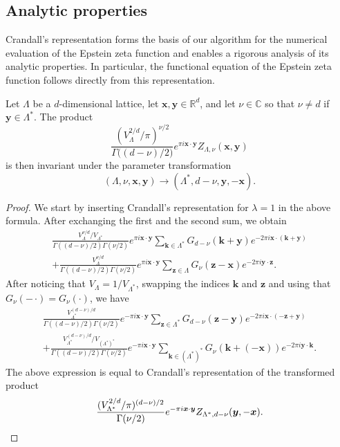 \documentclass[]{amsart}
\newcommand{\new}[1]{#1}
\newcommand{\zeps}[3]{\new{Z_{#1} (#2, #3)}}
\newcommand{\crandallreqs}{
Let \(\Lambda\) be a \(d\)-dimensional lattice,
let \(\bm x,\bm y\in\mathds{R}^d\), and let \(\nu\in\mathds C\)
so that \(\nu\neq d\) if \(\bm y\in\Lambda^{\ast}\). }
\numberwithin{mythm}{section}
\begin{document}
\subsection{Analytic properties}
\label{sec:props}

Crandall’s representation forms the basis of our algorithm for the numerical evaluation of the Epstein zeta function and enables a rigorous analysis of its analytic properties.  In particular, the functional equation of the Epstein zeta function follows directly from this representation.


\begin{corollary}
\label{funqeq}
\crandallreqs
The product
\[
\frac{(V_{\Lambda}^{2/d}/\pi)^{\nu/2}}{\Gamma\big((d-\nu)/2\big)}
e^{\pi i \bm x \cdot \bm y}\zeps{\Lambda, \nu}{\bm x}{\bm y}
\]
is then invariant under the parameter transformation
\[(\Lambda,\nu,\bm x,\bm y)\to 
(\Lambda^{\ast},d-\nu,\bm y,-\bm x).\]
\end{corollary}

\begin{proof}
We start by inserting Crandall's representation for $\lambda = 1$ in the above formula. After exchanging the first and the second sum, we obtain
\begin{align*}
\frac{V_{\Lambda}^{\nu/d}/V_{\Lambda^*}}{\Gamma((d-\nu)/2) \Gamma(\nu/2)} 
e^{\pi i \bm x \cdot \bm y}\sum_{\bm{k}\in\Lambda^{\ast}}G_{d-\nu}
(\bm{k}+\bm{y})e^{-2\pi i\bm{x}\cdot(\bm{k}+\bm{y})}
\\
+\frac{V_{\Lambda}^{\nu/d}}{\Gamma((d-\nu)/2) \Gamma(\nu/2)} 
e^{\pi i \bm x \cdot \bm y}\sum_{\bm{z}\in\Lambda}
G_{\nu}(\bm{z}-\bm{x})e^{-2\pi i\bm{y}\cdot\bm{z}}.
\end{align*}
After noticing that \(V_{\Lambda}=1/V_{\Lambda^{\ast}}\), swapping the indices \(\bm k\) and \(\bm z\)
and using that  \(G_\nu(-\,\bm \cdot)=G_\nu(\bm \cdot)\),
we have
\begin{align*}
\frac{V_{\Lambda^*}^{(d-\nu)/d}}{\Gamma((d-\nu)/2) \Gamma(\nu/2)} 
e^{-\pi i \bm x \cdot \bm y}\sum_{\bm{z}\in \Lambda^{\ast}}G_{d-\nu}
(\bm{z}-\bm{y})e^{-2\pi i\bm{x}\cdot (-\bm{z}+\bm y)}
\\
+\frac{V_{\Lambda^*}^{(d-\nu)/d}/V_{(\Lambda^*)^*}}{\Gamma((d-\nu)/2) \Gamma(\nu/2)} 
e^{-\pi i \bm x \cdot \bm y}\sum_{\bm{k}\in(\Lambda^{\ast})^{\ast}}
G_{\nu}(\bm{k}+(-\bm{x}))e^{-2\pi i\bm{y}\cdot\bm{k}}.
\end{align*}
The above expression is equal to Crandall's representation of the transformed product
\[
\frac{(V_{\Lambda^{\ast}}^{2/d}/\pi)^{(d-\nu)/2}}{\Gamma(\nu/2)}e^{-\pi i \bm x \cdot \bm y}
\zeps{\Lambda^{\ast},d-\nu}{\bm y}{-\bm x}.
\qedhere
\]
\end{proof}
\end{document}
